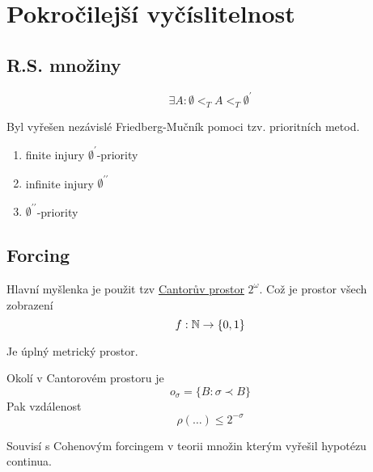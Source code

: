 \section{\texorpdfstring{Pokročilejší vyčíslitelnost}{Pokročilejší vyčíslitelnost}}
\vspace{5mm}
\large

\subsection{R.S. množiny}

\begin{definition}
	\[ \exists A: \emptyset <_T A <_T \emptyset^{\prime} \]

	Byl vyřešen nezávislé Friedberg-Mučník pomoci tzv. prioritních metod.
	\begin{enumerate}
		\item finite injury $\emptyset^{\prime}$-priority
		\item infinite injury $\emptyset^{\prime\prime}$
		\item $\emptyset^{\prime\prime}$-priority
	\end{enumerate}
\end{definition}

\subsection{Forcing}

\begin{definition}
	Hlavní myšlenka je použit tzv \href{https://en.wikipedia.org/wiki/Cantor_space}{Cantorův prostor} $2^{\omega}$.
	Což je prostor všech zobrazení
	\[ f:\operatorname{\mathbb{N}} \to \{ 0, 1 \} \]

	Je úplný metrický prostor.
\end{definition}

\begin{note}
	Okolí v Cantorovém prostoru je
	\[ o_{\sigma} = \{ B: \sigma \prec B \} \]
	Pak vzdálenost
	\[ \rho(\ldots) \leq 2^{-\sigma} \]
\end{note}

\begin{definition}
	Souvisí s Cohenovým forcingem v teorii množin kterým vyřešil hypotézu continua.
\end{definition}

